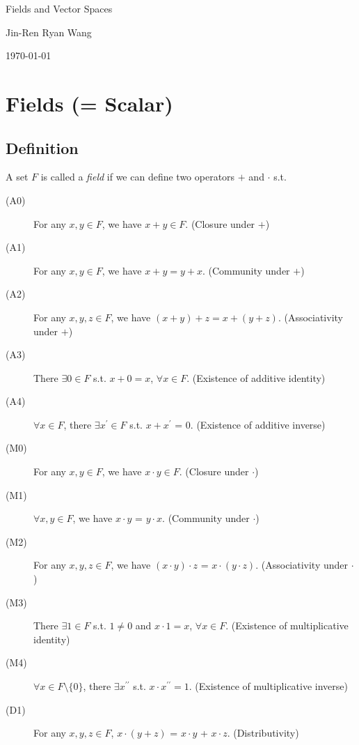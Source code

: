 \documentclass[12pt]{article}
\begin{document}
\begin{titlepage}
    \centering

    \vspace*{\fill}

    {\Huge Fields and Vector Spaces}

    \vspace{1cm}

    {\Large Jin-Ren Ryan Wang\par}

    \vspace{0.5cm}

    {\large \today\par}

    \vspace*{\fill}
\end{titlepage}

\tableofcontents

\newpage

\section{Fields (= Scalar)}

\subsection{Definition}
A set $F$ is called a \emph{field} if we can define two operators $+$ and $\cdot$ s.t.

\begin{description}

\item[(A0)] For any $x, y \in F$, we have $x + y \in F$. (Closure under $+$)
\item[(A1)] For any $x, y \in F$, we have $x + y = y + x$. (Community under $+$)
\item[(A2)] For any $x, y, z \in F$, we have  $(x + y) + z = x + (y + z)$. (Associativity under $+$)
\item[(A3)] There $\exists 0 \in F$ s.t. $x + 0 = x$, $\forall x \in F$. (Existence of additive identity)
\item[(A4)] $\forall x \in F$, there $\exists x^\prime \in F$ s.t. $x + x^\prime$ = 0. (Existence of additive inverse)
\item[(M0)] For any $x, y \in F$, we have $x \cdot y \in F$. (Closure under $\cdot$)
\item[(M1)] $\forall x, y \in F$, we have $x \cdot y$ = $y \cdot x$. (Community under $\cdot$)
\item[(M2)] For any $x, y, z \in F$, we have $(x \cdot y) \cdot z$ = $x \cdot (y \cdot z)$. (Associativity under $\cdot$)
\item[(M3)] There $\exists 1 \in F$ s.t. $1 \neq 0$ and $x \cdot 1 = x$, $\forall x \in F$. (Existence of multiplicative identity)
\item[(M4)] $\forall x \in F \setminus \{0\}$, there $\exists x^{\prime\prime}$ s.t. $x \cdot x^{\prime\prime} = 1$. (Existence of multiplicative inverse)
\item[(D1)] For any $x, y, z \in F$, $x \cdot (y + z)$ = $x \cdot y$ + $x \cdot z$. (Distributivity)

\end{description}
\end{document}
